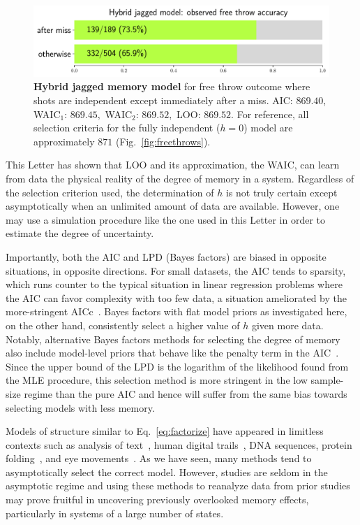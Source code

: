 \documentclass{IOS-Book-Article}
\begin{document}
\begin{figure}
\includegraphics[width=\linewidth]{fig5}

\caption{\textbf{Hybrid jagged memory model} for free throw outcome where shots are independent except immediately after a miss. AIC: $869.40$, WAIC$_1$: $869.45,$ WAIC$_2$: $869.52,$ LOO: $869.52.$ For reference, all selection criteria for the fully independent ($h=0$) model are approximately $871$ (Fig.~\ref{fig:freethrows}).} 
\label{fig:fig5}
\end{figure}

This Letter has shown that LOO and its approximation, the WAIC, can learn from data the physical reality of the 
degree of memory in a system. Regardless of the selection criterion used, the determination of $h$ is not truly certain except asymptotically when an unlimited amount of data are available. However, one may use a simulation procedure like the one used in this Letter in order to estimate the degree of uncertainty.  

Importantly,   both the AIC and LPD (Bayes factors) are biased in opposite situations, in opposite directions. For small datasets, the AIC tends to sparsity, which runs counter to the typical situation in linear regression problems where the AIC can favor complexity with too few data, a situation ameliorated by the more-stringent AICc~\cite{claeskens2008model}. Bayes factors with flat model  priors as investigated here, on the other hand, consistently select a higher value of $h$ given more data.
%
Notably, alternative Bayes factors methods for selecting the degree of memory also include model-level priors that behave like the penalty term in the AIC~\cite{strelioff2007inferring,singer2014detecting}. Since the upper bound of the LPD is the logarithm of the likelihood found from the MLE procedure, this selection method is more stringent in the low sample-size regime than the pure AIC and hence will suffer from the same bias towards selecting models with less memory.


Models of structure similar to Eq.~\ref{eq:factorize} have appeared in limitless contexts such as analysis of text~\cite{melnyk2006memory}, human digital trails~\cite{singer2014detecting}, DNA sequences, protein folding~\cite{yuan1999prediction}, and eye movements~\cite{bettenbuhl2012bayesian}. As we have seen, many methods tend to asymptotically select the correct model. However, studies are seldom in the asymptotic regime and using these methods  to reanalyze data from prior studies may prove fruitful in uncovering previously overlooked memory effects, particularly in systems of a large number of states. 
\end{document}
